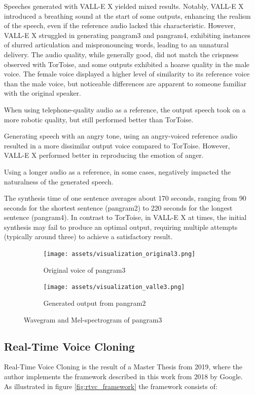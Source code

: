 Speeches generated with VALL-E X yielded mixed results. Notably, VALL-E X introduced a breathing sound at the start of some outputs, enhancing the realism of the speech, even if the reference audio lacked this characteristic. However, VALL-E X struggled in generating pangram3 and pangram4, exhibiting instances of slurred articulation and mispronouncing words, leading to an unnatural delivery. The audio quality, while generally good, did not match the crispness observed with TorToise, and some outputs exhibited a hoarse quality in the male voice. The female voice displayed a higher level of similarity to its reference voice than the male voice, but noticeable differences are apparent to someone familiar with the original speaker.

When using telephone-quality audio as a reference, the output speech took on a more robotic quality, but still performed better than TorToise.

Generating speech with an angry tone, using an angry-voiced reference audio resulted in a more dissimilar output voice compared to TorToise. However, VALL-E X performed better in reproducing the emotion of anger.

Using a longer audio as a reference, in some cases, negatively impacted the naturalness of the generated speech.

The synthesis time of one sentence averages about 170 seconds, ranging from 90 seconds for the shortest sentence (pangram2) to 220 seconds for the longest sentence (pangram4). In contrast to TorToise, in VALL-E X at times, the initial synthesis may fail to produce an optimal output, requiring multiple attempts (typically around three) to achieve a satisfactory result.

\begin{figure}
\centering
\begin{subfigure}{0.49\textwidth}
\centering
\texttt{[image: assets/visualization\_original3.png]}
\caption{Original voice of pangram3}
\label{fig:visualization_original3}
\end{subfigure}
\begin{subfigure}{0.49\textwidth}
\centering
\texttt{[image: assets/visualization\_valle3.png]}
\caption{Generated output from pangram2}
\label{fig:visualization_valle3}
\end{subfigure}
\caption{Wavegram and Mel-spectrogram of pangram3}
\label{fig:visualization_valle}
\end{figure}

\subsection{Real-Time Voice Cloning}
Real-Time Voice Cloning is the result of a Master Thesis\cite{jemine2019master} from 2019, where the author implements the framework described in this work\cite{jia2018transfer} from 2018 by Google.
As illustrated in figure \ref{fig:rtvc_framework} the framework consists of:

